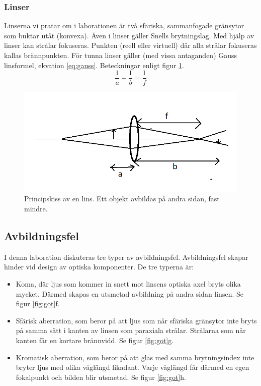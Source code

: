 \documentclass[a4paper]{article}
\begin{document}
\subsubsection{Linser}
Linserna vi pratar om i laborationen är två sfäriska, sammanfogade gränsytor som buktar utåt (konvexa). Även i linser gäller 
Snells brytningslag. Med hjälp av linser kan strålar fokuseras. Punkten (reell eller virtuell) där alla strålar fokuseras
kallas brännpunkten. För tunna linser gäller (med vissa antaganden) Gauss linsformel, ekvation \ref{eq:gauss}. Beteckningar enligt
figur \ref{fig:lens}.
\begin{equation}
    \frac{1}{a} + \frac{1}{b} = \frac{1}{f}
    \label{eq:gauss}
\end{equation}
\begin{figure}[h!]
    \includegraphics[height=0.3\textheight]{lens.png}
    \caption{Principskiss av en lins. Ett objekt avbildas på andra sidan, fast mindre.}
    \label{fig:lens}
\end{figure}
\subsection{Avbildningsfel}
I denna laboration diskuteras tre typer av avbildningsfel. Avbildningsfel skapar hinder vid design av optiska komponenter.
De tre typerna är:
\begin{itemize}
    \item Koma, där ljus som kommer in snett mot linsens optiska axel bryts olika mycket. Därmed skapas en utsmetad
    avbildning på andra sidan linsen. Se figur \ref{fig:got}f.
    \item Sfärisk aberration, som beror på att ljus som når sfäriska gränsytor inte bryts på samma sätt i kanten av linsen som paraxiala strålar.
    Strålarna som når kanten får en kortare brännvidd. Se figur \ref{fig:got}g.
    \item Kromatisk aberration, som beror på att glas med samma brytningsindex inte bryter ljus med olika våglängd
    likadant. Varje våglängd får därmed en egen fokalpunkt och bilden blir utsmetad. Se figur \ref{fig:got}h.
\end{itemize}
\end{document}
